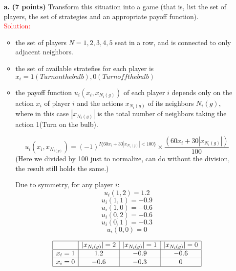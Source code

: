 \documentclass[11pt]{article} %
\begin{document}
\begin{itemize}
\item[\textbf{a.}] \textbf{(7 points)}  Transform this situation into a game (that is, list the set of players, the set of strategies and an appropriate payoff function).\\

\textcolor{red}{Solution:}

\begin{itemize}
\item the set of players $N={1,2,3,4,5}$ seat in a row, and is connected to only adjacent neighbors.
 
\begin{center}
\end{center}

\item the set of available stratefies for each player is $x_i={1(Turn on the bulb), 0(Turn off the bulb)}$

\item the payoff function $u_i(x_i,x_{N_i(g)})$ of each player $i$ depends only on the action $x_i$ of player $i$ and the actions $x_{N_i(g)}$ of its neighbors $N_i(g)$, where in this case $|x_{N_i(g)}|$ is the total number of neighbors taking the action 1(Turn on the bulb).

$$u_i(x_i, x_{N_{i(g)}})=  (-1)^{I\{60 x_i+ 30 |x_{N_i(g)}|<100\}} \times \frac{(60 x_i+ 30 |x_{N_i(g)}|)}{100} $$
(Here we divided by 100 just to normalize, can do without the division, the result still holds the same.)
  
Due to symmetry, for any player $i$:
$$u_i(1, 2)=1.2$$
$$u_i(1, 1)=-0.9$$
 $$u_i(1, 0)=-0.6$$
$$u_i(0, 2)= -0.6$$
$$u_i(0, 1)=-0.3$$
 $$u_i(0, 0)=0$$

$$\begin{array} {|c|c|c|c|} \hline
& \text{$|x_{N_i(g)}|=2$} & \text{$|x_{N_i(g)}|=1$} & \text{$|x_{N_i(g)}|=0$}\\ \hline
\text{$x_i=1$} & 1.2 & -0.9 & -0.6   \\ \hline
\text{$x_i=0$} & -0.6 & -0.3 & 0   \\ \hline
\end{array}$$	


\end{itemize}
\end{itemize}
\end{document}
